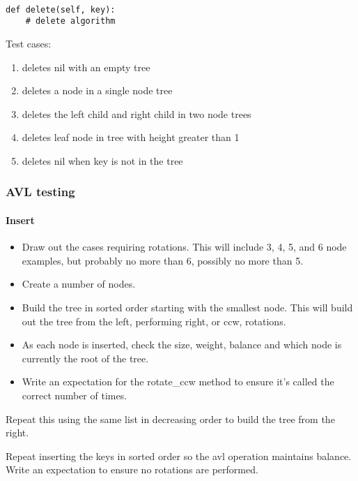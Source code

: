 \documentclass{article}
\begin{document}
\begin{lstlisting}[frame=single]

def delete(self, key):
    # delete algorithm
\end{lstlisting}


Test cases:
\begin{enumerate}
\item deletes nil with an empty tree
\item deletes a node in a single node tree
\item deletes the left child and right child in two node trees
\item deletes leaf node in tree with height greater than 1
\item deletes nil when key is not in the tree
\end{enumerate}


\subsubsection{AVL testing}

\paragraph{Insert}

\begin{itemize}
\item Draw out the cases requiring rotations. This will include 3, 4, 5, and 6
node examples, but probably no more than 6, possibly no more than 5.
\item Create a number of nodes.
\item Build the tree in sorted order starting with the smallest node.
This will build out the tree from the left, performing right, or ccw, rotations.
\item As each node is inserted, check the size, weight, balance and which node is currently the root of the tree.
\item Write an expectation for the rotate\_ccw method to ensure it's called the correct number of times.
\end{itemize}

Repeat this using the same list in decreasing order to build the tree from the
right.

Repeat inserting the keys in sorted order so the avl operation maintains
balance. Write an expectation to ensure no rotations are performed.
\end{document}

